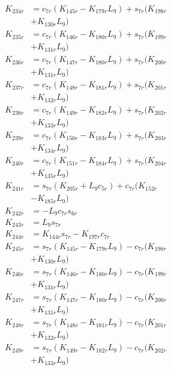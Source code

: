 \begin{align}
K_{234r} &= c_{7r}(K_{145r} - K_{179r}L_9) + s_{7r}(K_{198r}  \nonumber \\
&+ K_{130r}L_9) \nonumber \\
K_{235r} &= c_{7r}(K_{146r} - K_{180r}L_9) + s_{7r}(K_{199r}  \nonumber \\
&+ K_{131r}L_9) \nonumber \\
K_{236r} &= c_{7r}(K_{147r} - K_{180r}L_9) + s_{7r}(K_{200r}  \nonumber \\
&+ K_{131r}L_9) \nonumber \\
K_{237r} &= c_{7r}(K_{148r} - K_{181r}L_9) + s_{7r}(K_{201r}  \nonumber \\
&+ K_{132r}L_9) \nonumber \\
K_{238r} &= c_{7r}(K_{149r} - K_{182r}L_9) + s_{7r}(K_{202r}  \nonumber \\
&+ K_{133r}L_9) \nonumber \\
K_{239r} &= c_{7r}(K_{150r} - K_{183r}L_9) + s_{7r}(K_{203r}  \nonumber \\
&+ K_{134r}L_9) \nonumber \\
K_{240r} &= c_{7r}(K_{151r} - K_{184r}L_9) + s_{7r}(K_{204r}  \nonumber \\
&+ K_{135r}L_9) \nonumber \\
K_{241r} &= s_{7r}(K_{205r} + L_9c_{5r}) + c_{7r}(K_{152r}  \nonumber \\
&- K_{185r}L_9) \nonumber \\
K_{242r} &= -L_9c_{7r}s_{6r} \nonumber \\
K_{243r} &= L_9s_{7r} \nonumber \\
K_{244r} &= K_{144r}s_{7r} - K_{197r}c_{7r} \nonumber \\
K_{245r} &= s_{7r}(K_{145r} - K_{179r}L_9) - c_{7r}(K_{198r}  \nonumber \\
&+ K_{130r}L_9) \nonumber \\
K_{246r} &= s_{7r}(K_{146r} - K_{180r}L_9) - c_{7r}(K_{199r}  \nonumber \\
&+ K_{131r}L_9) \nonumber \\
K_{247r} &= s_{7r}(K_{147r} - K_{180r}L_9) - c_{7r}(K_{200r}  \nonumber \\
&+ K_{131r}L_9) \nonumber \\
K_{248r} &= s_{7r}(K_{148r} - K_{181r}L_9) - c_{7r}(K_{201r}  \nonumber \\
&+ K_{132r}L_9) \nonumber \\
K_{249r} &= s_{7r}(K_{149r} - K_{182r}L_9) - c_{7r}(K_{202r}  \nonumber \\
&+ K_{133r}L_9) \nonumber \\

\end{align}
